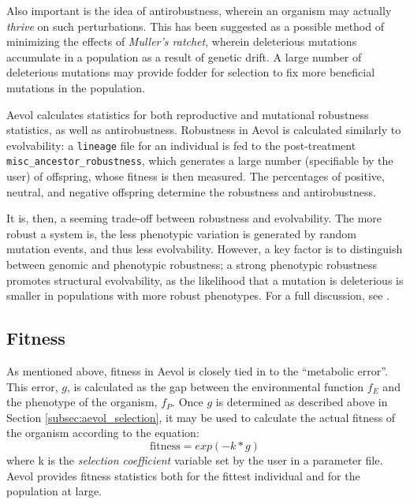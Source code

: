 Also important is the idea of antirobustness, wherein an organism may actually \textit{thrive} on such perturbations. This has been suggested as a possible method of minimizing the effects of \textit{Muller's ratchet}, wherein deleterious mutations accumulate in a population as a result of genetic drift\cite{Gordo2137}. A large number of deleterious mutations may provide fodder for selection to fix more beneficial mutations in the population\cite{doi:10.1186/s12862-019-1507-z}.

Aevol calculates statistics for both reproductive and mutational robustness statistics, as well as antirobustness. Robustness in Aevol is calculated similarly to evolvability: a \texttt{lineage} file for an individual is fed to the post-treatment \texttt{misc\_ancestor\_robustness}, which generates a large number (specifiable by the user) of offspring, whose fitness is then measured. The percentages of positive, neutral, and negative offspring determine the robustness and antirobustness. 

It is, then, a seeming trade-off between robustness and evolvability. The more robust a system is, the less phenotypic variation is generated by random mutation events, and thus less evolvability. However, a key factor is to distinguish between genomic and phenotypic robustness; a strong phenotypic robustness promotes structural evolvability, as the likelihood that a mutation is deleterious is smaller in populations with more robust phenotypes. For a full discussion, see \cite{doi:10.1098/rspb.2007.1137}.

\subsection{Fitness}\label{subsec:fitness}
As mentioned above, fitness in Aevol is closely tied in to the ``metabolic error''. This error, $g$, is calculated as the gap between the environmental function $f_E$ and the phenotype of the organism, $f_P$. Once $g$ is determined as described above in Section \ref{subsec:aevol_selection}, it may be used to calculate the actual fitness of the organism according to the equation:
\begin{equation*}
\text{fitness} = exp(-k*g)
\end{equation*} 
where k is the \textit{selection coefficient} variable set by the user in a parameter file. Aevol provides fitness statistics both for the fittest individual and for the population at large.

